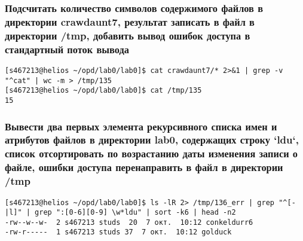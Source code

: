 \subsubsection*{Подсчитать количество символов содержимого файлов в директории crawdaunt7, результат записать в файл в директории /tmp, добавить вывод ошибок доступа в стандартный поток вывода}
\begin{verbatim}
[s467213@helios ~/opd/lab0/lab0]$ cat crawdaunt7/* 2>&1 | grep -v "^cat" | wc -m > /tmp/135
[s467213@helios ~/opd/lab0/lab0]$ cat /tmp/135
15
\end{verbatim}

\subsubsection*{Вывести два первых элемента рекурсивного списка имен и атрибутов файлов в директории lab0, содержащих строку `ldu`, список отсортировать по возрастанию даты изменения записи о файле, ошибки доступа перенаправить в файл в директории /tmp}
\begin{verbatim}
[s467213@helios ~/opd/lab0/lab0]$ ls -lR 2> /tmp/136_err | grep "^[-|l]" | grep ":[0-6][0-9] \w*ldu" | sort -k6 | head -n2
-rw--w--w-  2 s467213 studs  20  7 окт.  10:12 conkeldurr6
-rw-r-----  1 s467213 studs 37  7 окт.  10:12 golduck
\end{verbatim}